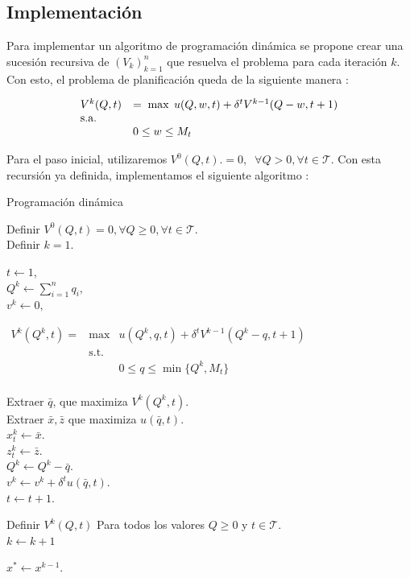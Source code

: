\documentclass[12pt,letterpaper]{article}
\newcommand\mT{\mathcal{T}}
\begin{document}
\subsection{Implementación}

Para implementar un algoritmo de programación dinámica se propone crear una sucesión recursiva de $(V_k)_{k=1}^n$ que resuelva el problema para cada iteración $k$. Con esto, el problema de planificación queda de la siguiente manera :

\[
\begin{array}{lllll}
V^k(Q,t) &  \multicolumn{4}{l}{ = \; \max \; u(Q,w,t) + \delta^t V^{k-1}(Q-w,t+1) } \\
\text{s.a.} & & & & \\
& 0  \leq w \leq M_t \\
\end{array}
\]

Para el paso inicial, utilizaremos $V^0(Q,t).=0, \;\; \forall Q>0, \forall t \in \mT$. 
Con esta recursión ya definida, implementamos el siguiente algoritmo : 
\begin{algorithm}
\caption{Programación dinámica}\label{alg:dp}

Definir $V^0(Q,t) = 0, \forall Q \geq 0, \forall t \in \mT$.\\ 
Definir  $k=1$.\\

{
$t \leftarrow 1$,\\
$Q^k \leftarrow \sum\limits_{i=1}^n q_i,$\\
$v^k \leftarrow 0,$

\While{$Q^k > 0$ and $t \in \mT$}
{
$
\begin{array}{lll}
V^k(Q^k,t)  =  & \max & u(Q^k,q,t) + \delta^t V^{k-1}(Q^k - q, t+1) \\
            & \text{s.t.} &    \\
            & &  0 \leq q \leq \min\{Q^k, M_{t}\} \\
\end{array}
$

Extraer $\bar q$, que maximiza $V^k(Q^k,t)$.\\ 
Extraer $\bar x, \bar z$ que maximiza $u(\bar q, t)$.\\  

$x_{t}^k \leftarrow \bar x$.\\
$z^k_{t} \leftarrow \bar z$.\\
$Q^k \leftarrow Q^k - \bar q$.\\
$v^k \leftarrow v^k + \delta^t u(\bar q,t)$.\\
$t \leftarrow t+1.$\\

}
Definir $V^k(Q,t)$ Para todos los valores $Q \geq 0$ y $t \in \mT$.\\
$k \leftarrow k+1$\\
}
$x^* \leftarrow x^{k-1}$.
\end{algorithm}
\end{document}
